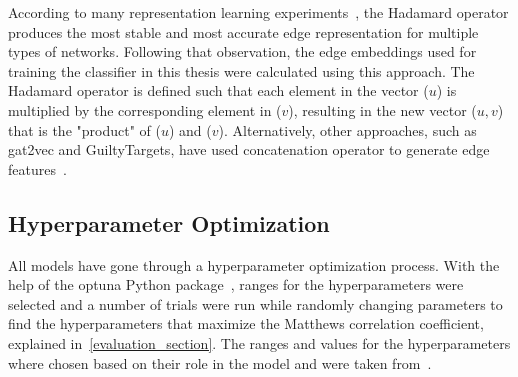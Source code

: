According to many representation learning experiments~\cite{grover_node2vec:_2016, tsitsulin_verse:_2018, yuan_sne:_2017}, the Hadamard operator produces the most stable and most accurate edge representation for multiple types of networks.
Following that observation, the edge embeddings used for training the classifier in this thesis were calculated using this approach.
The Hadamard operator is defined such that each element in the vector ($u$) is multiplied by the corresponding element in ($v$), resulting in the new vector ($u,v$) that is the "product" of ($u$) and ($v$).
Alternatively, other approaches, such as gat2vec and GuiltyTargets, have used concatenation operator to generate edge features~\cite{muslu_guiltytargets:_2019, sheikh_gat2vec:_2018}.

\subsection{Hyperparameter Optimization}

All models have gone through a hyperparameter optimization process.
With the help of the optuna Python package~\cite{akiba_optuna:_2019}, ranges for the hyperparameters were selected and a number of trials were run while randomly changing parameters to find the hyperparameters that maximize the Matthews correlation coefficient, explained in~\ref{evaluation_section}.
The ranges and values for the hyperparameters where chosen based on their role in the model and were taken from~\cite{yue_graph_2019}.


